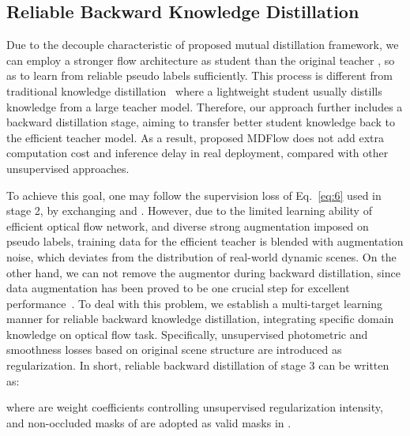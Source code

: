 \documentclass[lettersize,journal]{IEEEtran}
\begin{document}
\subsection{Reliable Backward Knowledge Distillation}
Due to the decouple characteristic of proposed mutual distillation framework, we can employ a stronger flow architecture as student  than the original teacher , so as to learn from reliable pseudo labels sufficiently. This process is different from traditional knowledge distillation~\cite{44873,aleotti2020learning} where a lightweight student usually distills knowledge from a large teacher model. Therefore, our approach further includes a backward distillation stage, aiming to transfer better student knowledge back to the efficient teacher model. As a result, proposed MDFlow does not add extra computation cost and inference delay in real deployment, compared with other unsupervised approaches.

To achieve this goal, one may follow the supervision loss of Eq.~\ref{eq:6} used in stage 2, by exchanging  and . However, due to the limited learning ability of efficient optical flow network, and diverse strong augmentation imposed on pseudo labels, training data for the efficient teacher  is blended with augmentation noise, which deviates from the distribution of real-world dynamic scenes. On the other hand, we can not remove the augmentor  during backward distillation, since data augmentation has been proved to be one crucial step for excellent performance~\cite{8621052,Bar-Haim_2020_CVPR}. To deal with this problem, we establish a multi-target learning manner for reliable backward knowledge distillation, integrating specific domain knowledge on optical flow task. Specifically, unsupervised photometric and smoothness losses based on original scene structure are introduced as regularization. In short, reliable backward distillation of stage 3 can be written as:

where  are weight coefficients controlling unsupervised regularization intensity, and non-occluded masks  of  are adopted as valid masks in .
\end{document}
